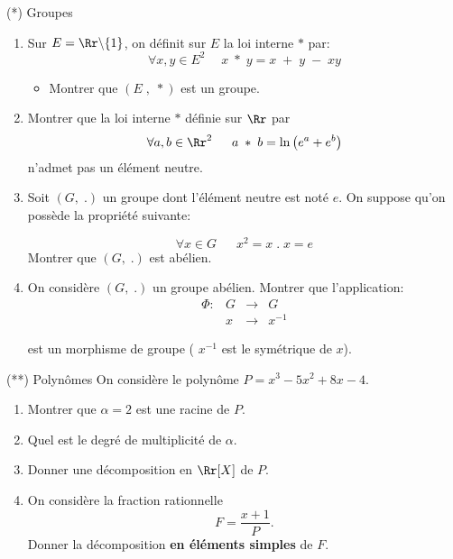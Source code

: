 \documentclass[exam]{cs188}
\begin{document}
\begin{problem}[6]{(*) Groupes}
   \begin{enumerate}
       \item Sur $E = \Rr\backslash\{1\}$, on définit sur $E$ la loi interne $*$
           par:
           \begin{equation}
           \forall x,y\in E^2\;\quad     x\;*\;y  = x\;+\;y\;-\;xy
           \end{equation}
        \begin{itemize}
            \item Montrer que $\left(E\;,\;*\right)$ est un groupe.
        \end{itemize}
    \item Montrer que la loi interne $*$ définie sur $\Rr$ par 
        $$
        \forall a,b\in \Rr^2\;\quad\;a\;*\; b = \ln\left(e^a + e^b\right)
        $$
        n'admet pas un élément neutre.
    \item Soit $\left(G,\;.\right)$ un groupe dont l'élément neutre est noté
        $e$. On suppose qu'on possède la propriété suivante:

        \begin{equation*}
           \forall x\in G\;\quad\; x^2 = x\;.\;x = e 
        \end{equation*}
        Montrer que $(G,\;.)$ est abélien.
    \item On considère $\left(G,\;.\right)$ un groupe abélien. Montrer que
        l'application:
        $$
        \begin{array}{llll}
            \Phi: &G&\longrightarrow &G\\
                  &x &\longrightarrow& x^{-1}
    \end{array}
        $$


        est un morphisme de groupe ( $x^{-1}$ est le symétrique de $x$).
   \end{enumerate} 
   
\end{problem}
\newpage
\begin{problem}[6]{(**) Polynômes}
On considère le polynôme $P=x^3-5x^2 + 8x-4$.

\begin{enumerate}
    \item Montrer que $\alpha=2$ est une racine de $P$.
    \item Quel est le degré de multiplicité de $\alpha$.
    \item Donner une décomposition en $\Rr[X]$ de $P$.  
    \item On considère la fraction rationnelle $$F=\dfrac{x+1}{P}.$$ Donner la
        décomposition \textbf{en éléments simples}  de $F$.
\end{enumerate}
\end{problem}
\end{document}
